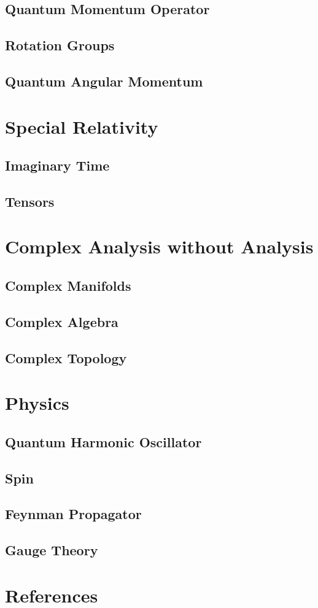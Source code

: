 \documentclass[12pt]{article}
\theoremstyle{definition}
\theoremstyle{remark}
\theoremstyle{example}
\theoremstyle{theorem}
\theoremstyle{lemma}
\begin{document}
\subsection{Quantum Momentum Operator}

\subsection{Rotation Groups}

\subsection{Quantum Angular Momentum}

\section{Special Relativity}

\subsection{Imaginary Time}

\subsection{Tensors}

\section{Complex Analysis without Analysis}

\subsection{Complex Manifolds}

\subsection{Complex Algebra}

\subsection{Complex Topology}

\section{Physics}

\subsection{Quantum Harmonic Oscillator}

\subsection{Spin}

\subsection{Feynman Propagator}

\subsection{Gauge Theory}



\section{References}
\end{document}
